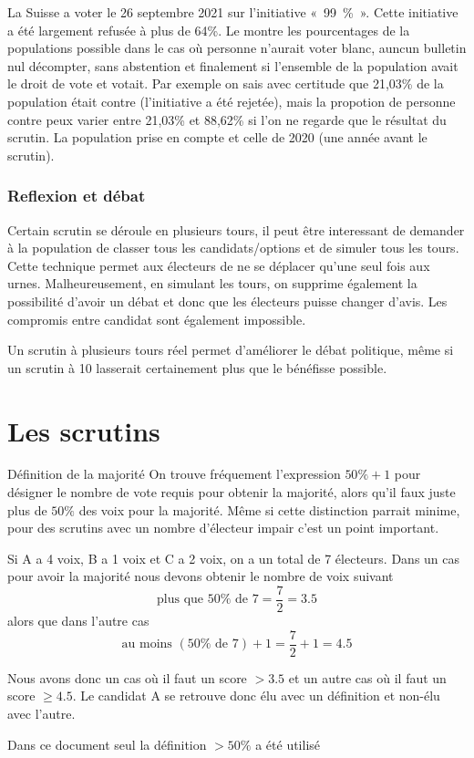 \documentclass[../report]{subfiles}
\begin{document}
  La Suisse a voter le 26 septembre 2021 sur l'initiative «~99~\%~».
  Cette initiative a été largement refusée à plus de 64\%.
  Le  montre les pourcentages de la populations possible dans le 
  cas où personne n'aurait voter blanc, auncun bulletin nul décompter, sans abstention et 
  finalement si l'ensemble de la population avait le droit de vote et votait.
  Par exemple on sais avec certitude que 21,03\% de la population était contre 
  (l'initiative a été rejetée), mais la propotion de personne contre peux varier entre 
  21,03\% et 88,62\% si l'on ne regarde que le résultat du scrutin.
  La population prise en compte et celle de 2020 (une année avant le scrutin).

  \subsection{Reflexion et débat}

  Certain scrutin se déroule en plusieurs tours, il peut être interessant de demander à la 
  population de classer tous les candidats/options et de simuler tous les tours.
  Cette technique permet aux électeurs de ne se déplacer qu'une seul fois aux urnes.
  Malheureusement, en simulant les tours, on supprime également la possibilité d'avoir un
  débat et donc que les électeurs puisse changer d'avis.
  Les compromis entre candidat sont également impossible.

  Un scrutin à plusieurs tours réel permet d'améliorer le débat politique, même si un scrutin 
  à 10 lasserait certainement plus que le bénéfisse possible.

  \chapter{Les scrutins}

  \begin{important}[$50\% + 1$ versus $ > 50\%$]{Définition de la majorité}
    On trouve fréquement l'expression $50\%+1$ pour désigner le nombre de vote requis pour
    obtenir la majorité, alors qu'il faux juste plus de $50\%$ des voix pour la majorité.
    Même si cette distinction parrait minime, pour des scrutins avec un nombre d'électeur 
    impair c'est un point important.

    Si A a 4 voix, B a 1 voix et C a 2 voix, on a un total de 7 électeurs.
    Dans un cas pour avoir la majorité nous devons obtenir le nombre de voix suivant
    \[ \text{plus que }50\%\text{ de }7 = \frac{7}{2} = 3.5 \]
    alors que dans l'autre cas
    \[ \text{au moins }(50\%\text{ de }7) + 1 = \frac{7}{2} + 1 = 4.5 \]

    Nous avons donc un cas où il faut un score $ > 3.5 $ et un autre cas où il faut un score 
    $ \geqslant 4.5 $.
    Le candidat A se retrouve donc élu avec un définition et non-élu avec l'autre.

    Dans ce document seul la définition $> 50\%$ a été utilisé
  \end{important}
\end{document}

